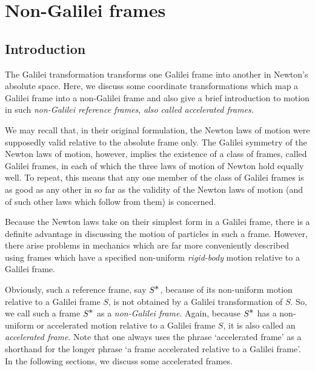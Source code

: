 \chapter{Non-Galilei frames}





\section{Introduction}

\vspace{-.2cm}

The  Galilei transformation transforms one  Galilei frame 
into another in Newton's  absolute space. Here, we discuss 
some coordinate transformations which map a Galilei frame 
into a non-Galilei frame and also give a brief introduction 
to motion in such \textsl{non-Galilei reference frames}, 
\textsl{also called accelerated frames.} 

We may recall that, in their original formulation, the 
Newton laws of motion were supposedly valid relative to the 
absolute frame only. The Galilei symmetry of the Newton laws 
of motion, however, implies the existence of a class of 
frames, called Galilei frames, in each of which the three 
laws of motion of Newton hold equally well. To repeat, this 
means that any one member of the class of Galilei frames is 
as good as any other in so far as the validity of the Newton 
laws of motion (and of such other laws  which follow from 
them) is concerned.

Because the Newton laws take on their simplest form in a 
Galilei frame, there is a definite advantage in  discussing 
the motion of particles in such a  frame. However, there 
arise  problems in mechanics which are far more 
conveniently described  using frames which have a specified 
non-uniform \textsl{rigid-body} motion relative to a 
Galilei frame. 


Obviously, such a reference frame, say $S^{\textstyle \ast}$, because of 
its non-uniform motion relative to a Galilei frame $S$, is 
not  obtained by a  Galilei transformation of $S$. So, we 
call such a frame $S^{\textstyle \ast}$ as a \textsl{non-Galilei frame}. 
Again, because $S^{\textstyle \ast}$ has a non-uniform or accelerated 
motion relative to a Galilei frame $S$, it is  also called 
an \textsl{accelerated frame}. Note that one always uses 
the  phrase `accelerated frame' as a shorthand for 
the longer phrase `a frame accelerated relative to a 
Galilei frame'. In the following sections, we  discuss 
some accelerated frames.

